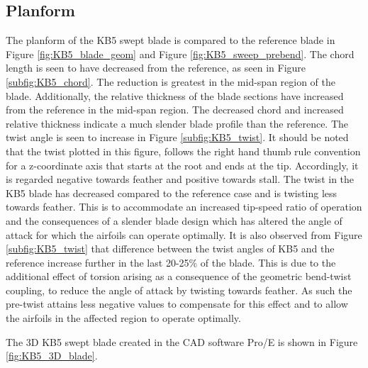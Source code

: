 
\subsection{Planform}
The planform of the KB5 swept blade is compared to the reference blade in Figure \ref{fig:KB5_blade_geom} and Figure \ref{fig:KB5_sweep_prebend}. The chord length is seen to have decreased from the reference, as seen in Figure \ref{subfig:KB5_chord}. The reduction is greatest in the mid-span region of the blade. Additionally, the relative thickness of the blade sections have increased from the reference in the mid-span region. The decreased chord and increased relative thickness indicate a much slender blade profile than the reference. The twist angle is seen to increase in Figure \ref{subfig:KB5_twist}. It should be noted that the twist plotted in this figure, follows the right hand thumb rule convention for a z-coordinate axis that starts at the root and ends at the tip. Accordingly, it is regarded negative towards feather and positive towards stall. The twist in the KB5 blade has decreased compared to the reference case and is twisting less towards feather. This is to accommodate an increased tip-speed ratio of operation and the consequences of a slender blade design which has altered the angle of attack for which the airfoils can operate optimally. It is also observed from Figure \ref{subfig:KB5_twist} that difference between the twist angles of KB5 and the reference increase further in the last 20-25\% of the blade. This is due to the additional effect of torsion arising as a consequence of the geometric bend-twist coupling, to reduce the angle of attack by twisting towards feather. As such the pre-twist attains less negative values to compensate for this effect and to allow the airfoils in the affected region to operate optimally.

The 3D KB5 swept blade created in the CAD software Pro/E is shown in Figure \ref{fig:KB5_3D_blade}.

